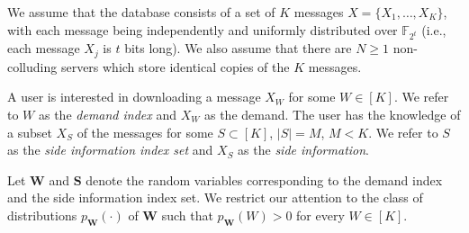 \documentclass[letterpaper, 10 pt, conference]{ieeeconf}
\newcommand\alex[1]{\add[alex]{#1}}
\newcommand\alexn[1]{\notee[alex]{#1}}
\newcommand\salimn[1]{\notee[salim]{#1}}
\newcommand{\ie}{{\it i.e.}}
\newcommand{\Xj}[1]{X_{#1}} %
\newcommand{\Hp}[1]{H\left(#1\right)} %
\newcommand{\GF}[1]{\mathbb{F}_{#1}} %
\begin{document}
We assume that the database consists of a set of $K$ messages $X = \{\Xj{1}, \dots,\Xj{K}\}$, with each message being independently and uniformly distributed over $\GF{2^t}$ (i.e., each message $X_j$ is $t$ bits long). %
We also assume that there are $N\geq 1$ non-colluding servers %
which store identical copies of the $K$ messages.


A user is interested in downloading a message $X_W$ for some $W\in [K]$. We refer to $W$ as the \emph{demand index} and $X_W$ as the demand. %
The user has the knowledge of a subset $X_S$ of the messages %
for some $S\subset [K]$, $|S| = M$, $M<K$. %
We refer to $S$ as the \emph{side information index set} and $X_S$ %
as the \emph{side information}. 

Let $\mathbf{W}$ and $\mathbf{S}$ denote the random variables corresponding to the demand index and the side information index set. %
We restrict our attention to the class of distributions $p_{\mathbf{W}}(\cdot)$ of $\mathbf{W}$ such that $p_{\mathbf{W}}(W) > 0$ for every $W\in[K]$.
\end{document}
